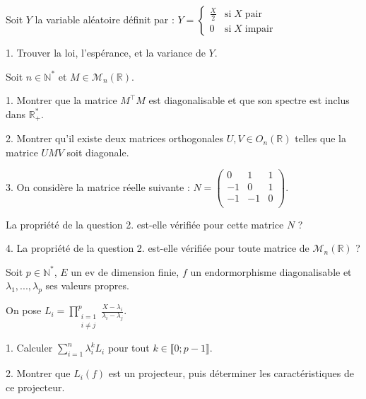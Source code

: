 \noindent Soit $Y$ la variable aléatoire définit par : $Y =
\begin{cases}
  \frac {X} {2} & \mathrm{si} \;X\; \mathrm{pair}   \\    
  0             & \mathrm{si} \;X\; \mathrm{impair} 
\end{cases}
$

\vspace{5pt}
1. Trouver la loi, l'espérance, et la variance de $Y$.



\subetoiles



\noindent Soit $n \in \mathbb{N}^*$ et $M \in \mathcal{M}_n(\mathbb{R})$.

\vspace{5pt}
1. Montrer que la matrice $M^\top M$ est diagonalisable et que son spectre est inclus dans $\mathbb{R}_+^*$.

\vspace{5pt}
2. Montrer qu'il existe deux matrices orthogonales $U, V \in O_n(\mathbb{R})$ telles que la matrice $UMV$ soit diagonale.

\vspace{5pt}
3. On considère la matrice réelle suivante : $ N =
\begin{pmatrix}
 0 &  1 & 1 \\
-1 &  0 & 1 \\
-1 & -1 & 0 \\
\end{pmatrix}
$.

La propriété de la question 2. est-elle vérifiée pour cette matrice $N$ ?

\vspace{5pt}
4. La propriété de la question 2. est-elle vérifiée pour toute matrice de $\mathcal{M}_n(\mathbb{R})$ ?



\subetoiles



\noindent Soit $p \in \mathbb{N}^*$, $E$ un ev de dimension finie, $f$ un endormorphisme diagonalisable et $\lambda_1, ..., \lambda_p$ ses valeurs propres.

\noindent On pose $\displaystyle L_i = \prod_{\substack{i = 1 \\ i \ne j}}^{p} \frac {X - \lambda_i} {\lambda_i - \lambda_j}$.

\vspace{5pt}
1. Calculer $\displaystyle \sum_{i=1}^{n}\lambda_i^kL_i$ pour tout $k \in \llbracket 0;p-1 \rrbracket$.

\vspace{5pt}
2. Montrer que $L_i(f)$ est un projecteur, puis déterminer les caractéristiques de ce projecteur.